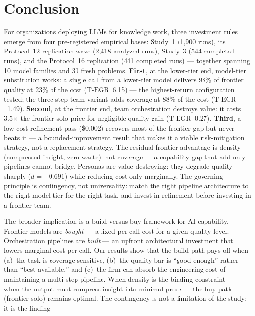 \documentclass[12pt,a4paper]{article}
\newcommand{\TEGR}{\ensuremath{\text{T-EGR}}}
\begin{document}
\section{Conclusion}\label{sec:conclusion}

For organizations deploying LLMs for knowledge work, three investment rules
emerge from four pre-registered empirical bases: Study~1 (1{,}900 runs), its
Protocol~12 replication wave (2{,}418 analyzed runs), Study~3 (544 completed
runs), and the Protocol~16 replication (441 completed runs) --- together
spanning 10 model families and 30 fresh problems. \textbf{First}, at the lower-tier end,
model-tier substitution works: a single call from a lower-tier model
delivers 98\% of frontier quality at 23\% of the cost ($\TEGR$~6.15) --- the
highest-return configuration tested; the three-step team variant adds coverage
at 88\% of the cost ($\TEGR$~1.49). \textbf{Second}, at the frontier end, team
orchestration destroys value: it costs 3.5$\times$ the frontier-solo price for
negligible quality gain ($\TEGR$~0.27). \textbf{Third}, a low-cost refinement pass
(\$0.002) recovers most of the frontier gap but never beats it --- a
bounded-improvement result that makes it a viable risk-mitigation strategy, not
a replacement strategy. The residual frontier advantage is density (compressed
insight, zero waste), not coverage --- a capability gap that add-only pipelines
cannot bridge. Personas are value-destroying: they degrade quality sharply
($d = -0.691$) while reducing cost only marginally. The governing principle is contingency, not universality: match the
right pipeline architecture to the right model tier for the right task, and
invest in refinement before investing in a frontier team.

The broader implication is a build-versus-buy framework for AI capability.
Frontier models are \emph{bought} --- a fixed per-call cost for a given quality
level. Orchestration pipelines are \emph{built} --- an upfront architectural
investment that lowers marginal cost per call. Our results show that the build
path pays off when (a)~the task is coverage-sensitive, (b)~the quality bar is
``good enough'' rather than ``best available,'' and (c)~the firm can absorb the
engineering cost of maintaining a multi-step pipeline. When density is the
binding constraint --- when the output must compress insight into minimal prose
--- the buy path (frontier solo) remains optimal. The contingency is not a
limitation of the study; it is the finding.
\end{document}
